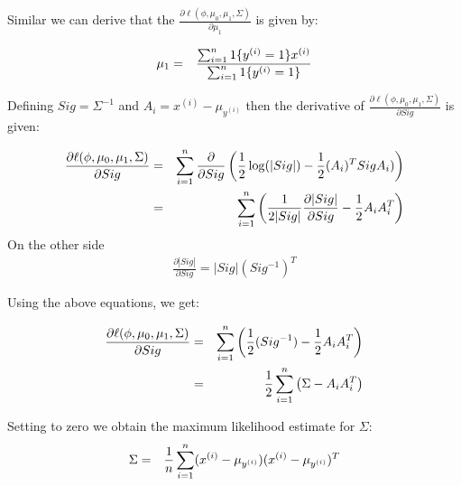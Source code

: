 \begin{answer}
 Similar we can derive that the  $\frac{\partial \ell(\phi, \mu_{0}, \mu_1, \Sigma)}{\partial \mu_1}$ is given by:
 
 \begin{eqnarray*}
  \mu_{1} &=& \frac{\sum_{i=1}^{n} 1\{y^{(i)} = 1\} x^{(i)}}{\sum_{i=1}^{n} 1\{y^{(i)} =1\}} 
\end{eqnarray*}

Defining $Sig = \Sigma^{-1}$ and $A_{i} = x^{(i)}-\mu_{y^{(i)}}$ then the derivative of   $\frac{\partial \ell(\phi, \mu_{0}, \mu_1, \Sigma)}{\partial Sig}$ is given: 

 \begin{eqnarray*}
 \frac{\partial \ell(\phi, \mu_{0}, \mu_1, \Sigma)}{\partial Sig} &=&
  \sum_{i=1}^{n} \frac{\partial}{\partial  Sig} \left( \frac{1}{2} \log(|Sig|) - \frac{1}{2} (A_{i})^T Sig A_{i}) \right) \\
 &=& \sum_{i=1}^{n} \left( \frac{1}{2|Sig|} \frac{\partial |Sig|}{\partial Sig} -\frac{1}{2} A_{i} A_{i}^T    \right)
 \end{eqnarray*}
 On the other side
 \begin{eqnarray*}
 \frac{\partial |Sig|}{\partial Sig} = |Sig|(Sig^{-1})^T
 \end{eqnarray*}
 
 Using the above equations, we get:
 
 \begin{eqnarray*}
 \frac{\partial \ell(\phi, \mu_{0}, \mu_1, \Sigma)}{\partial Sig} &=& \sum_{i=1}^{n} \left( \frac{1}{2} (Sig^{-1}) -\frac{1}{2} A_{i} A_{i}^T  \right)\\
 &=& \frac{1}{2} \sum_{i=1}^{n} \left(\Sigma - A_{i} A_{i}^T
 \right)
 \end{eqnarray*}
 
 
 Setting to zero we obtain the maximum likelihood estimate for $\Sigma$:
 \begin{eqnarray*}
 \Sigma &=& \frac{1}{{n}} \sum_{i=1}^{n} (x^{(i)} - \mu_{y^{(i)}}) (x^{(i)} -\mu_{y^{(i)}})^T
  \end{eqnarray*}
 \end{answer}
